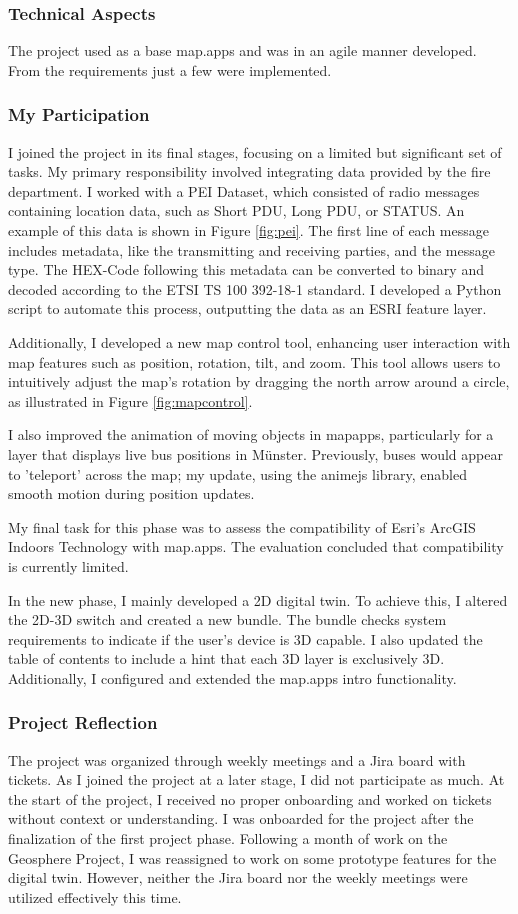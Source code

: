 \documentclass[11pt, titlepage, a4paper]{article}
\begin{document}
\subsubsection{Technical Aspects}
The project used as a base map.apps and was in an agile manner developed. From the requirements just a few were implemented.

\subsubsection{My Participation}
I joined the project in its final stages, focusing on a limited but significant set of tasks. My primary responsibility involved integrating data provided by the fire department. I worked with a PEI Dataset, which consisted of radio messages containing location data, such as Short PDU, Long PDU, or STATUS. An example of this data is shown in Figure \ref{fig:pei}. The first line of each message includes metadata, like the transmitting and receiving parties, and the message type. The HEX-Code following this metadata can be converted to binary and decoded according to the ETSI TS 100 392-18-1 standard. I developed a Python script to automate this process, outputting the data as an ESRI feature layer.

Additionally, I developed a new map control tool, enhancing user interaction with map features such as position, rotation, tilt, and zoom. This tool allows users to intuitively adjust the map's rotation by dragging the north arrow around a circle, as illustrated in Figure \ref{fig:mapcontrol}.


I also improved the animation of moving objects in mapapps, particularly for a layer that displays live bus positions in Münster. Previously, buses would appear to 'teleport' across the map; my update, using the animejs library, enabled smooth motion during position updates.

My final task for this phase was to assess the compatibility of Esri's ArcGIS Indoors Technology with map.apps. The evaluation concluded that compatibility is currently limited.

In the new phase, I mainly developed a 2D digital twin. To achieve this, I altered the 2D-3D switch and created a new bundle. The bundle checks system requirements to indicate if the user's device is 3D capable. I also updated the table of contents to include a hint that each 3D layer is exclusively 3D. 
Additionally, I configured and extended the map.apps intro functionality.
\subsubsection{Project Reflection}
The project was organized through weekly meetings and a Jira board with tickets. As I joined the project at a later stage, I did not participate as much. At the start of the project, I received no proper onboarding and worked on tickets without context or understanding. I was onboarded for the project after the finalization of the first project phase. Following a month of work on the Geosphere Project, I was reassigned to work on some prototype features for the digital twin. However, neither the Jira board nor the weekly meetings were utilized effectively this time.
\end{document}
